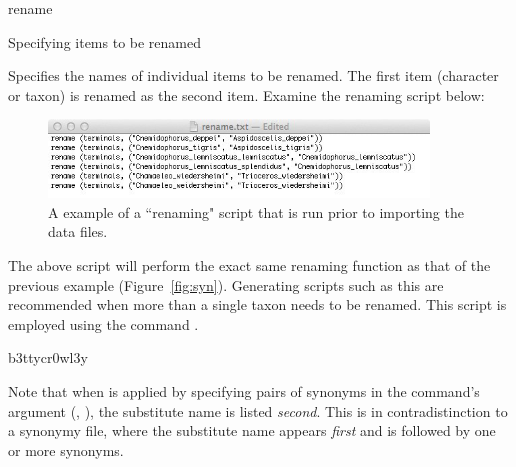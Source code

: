 \begin{command}{rename}{}
\begin{arguments}
\begin{argumentgroup}{Specifying items to be renamed}
                {Specifies the names of individual items to be renamed. The first item (character or taxon) is renamed
                as the second item.                
                Examine the renaming script below: 

\begin{figure}[th!]
    \begin{center}
        \includegraphics[width=0.9\textwidth]{doc/figures/rename.jpg}
    \end{center}
    \caption{A example of a ``renaming" script that is run prior to importing the data files.}
    \label{fig:rename}
\end{figure}

        
	The above script will perform the exact same renaming function as that of the previous example 
	(Figure~\ref{fig:syn}).  Generating scripts such as this are recommended when more than a single taxon 
	needs to be renamed.  This script is employed using the command . %
                }
                {}        
                	   b3ttycr0wl3y    
                \begin{statement}
                Note that when  is applied by specifying pairs of
                 synonyms in the command's argument (\poystring, \poystring),
                the substitute name is listed \emph{second}. This is in contradistinction to 
                a synonymy file, where the substitute name 
                appears \emph{first} and is followed by one or more synonyms.
                \end{statement}
	      \end{argumentgroup}
	      
          \end{arguments}
          
          \begin{poyexamples}
          
            

\end{poyexamples}
\end{command}
